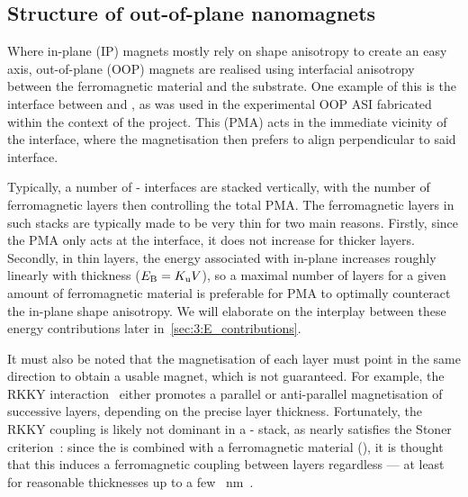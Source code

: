 \subsection{Structure of out-of-plane nanomagnets} %
\label{sec:3:OOP_nanomagnet_PMA}
Where in-plane (IP) magnets mostly rely on shape anisotropy to create an easy axis, out-of-plane (OOP) magnets are realised using interfacial anisotropy between the ferromagnetic material and the substrate.
One example of this is the interface between  and , as was used in the experimental OOP ASI fabricated within the context of the \spinengine project.
This  (PMA) acts in the immediate vicinity of the interface, where the magnetisation then prefers to align perpendicular to said interface. \par
Typically, a number of - interfaces are stacked vertically, with the number of ferromagnetic  layers then controlling the total PMA.
The ferromagnetic layers in such stacks are typically made to be very thin for two main reasons.
Firstly, since the PMA only acts at the interface, it does not increase for thicker layers.
Secondly, in thin layers, the energy associated with in-plane  increases roughly linearly with thickness ($E_\mathrm{B}=K_\mathrm{u}V$), so a maximal number of layers for a given amount of ferromagnetic material is preferable for PMA to optimally counteract the in-plane shape anisotropy.
We will elaborate on the interplay between these energy contributions later in~\cref{sec:3:E_contributions}. \par
It must also be noted that the magnetisation of each  layer must point in the same direction to obtain a usable magnet, which is not guaranteed.
For example, the RKKY interaction~\cite{RKKY_RK,RKKY_K,RKKY_Y} either promotes a parallel or anti-parallel magnetisation of successive  layers, depending on the precise  layer thickness.
Fortunately, the RKKY coupling is likely not dominant in a - stack, as  nearly satisfies the Stoner criterion~\cite{PtMagneticOrder}: since the  is combined with a ferromagnetic material (), it is thought that this induces a ferromagnetic coupling between  layers regardless --- at least for reasonable  thicknesses up to a few \SI{}{\nano\metre}~\cite{PerpendicularMagnetizationASI}.

